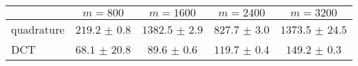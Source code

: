 \centering
\renewcommand{\arraystretch}{1.2}
\begin{tabular}{@{}lcccc@{}}
\toprule
 & $m=800$ & $m=1600$ & $m=2400$ & $m=3200$\\
\midrule
quadrature & $219.2$ $\pm$ $0.8$ & $1382.5$ $\pm$ $2.9$ & $827.7$ $\pm$ $3.0$ & $1373.5$ $\pm$ $24.5$ \\
DCT & $68.1$ $\pm$ $20.8$ & $89.6$ $\pm$ $0.6$ & $119.7$ $\pm$ $0.4$ & $149.2$ $\pm$ $0.3$ \\
\bottomrule
\end{tabular}
